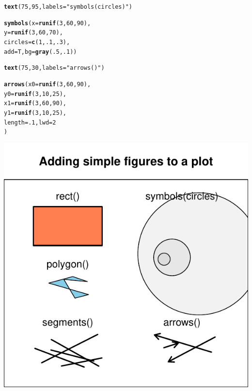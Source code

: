 \documentclass{tufte-book}\usepackage[]{graphicx}\usepackage[]{color}
\makeatletter
\def\maxwidth{ %
  \ifdim\Gin@nat@width>\linewidth
    \linewidth
  \else
    \Gin@nat@width
  \fi
}
\newcommand{\hlnum}[1]{\textcolor[rgb]{0.686,0.059,0.569}{#1}}%
\newcommand{\hlstr}[1]{\textcolor[rgb]{0.192,0.494,0.8}{#1}}%
\newcommand{\hlstd}[1]{\textcolor[rgb]{0.345,0.345,0.345}{#1}}%
\newcommand{\hlkwc}[1]{\textcolor[rgb]{0.333,0.667,0.333}{#1}}%
\newcommand{\hlkwd}[1]{\textcolor[rgb]{0.737,0.353,0.396}{\textbf{#1}}}%
\newenvironment{kframe}{%
 \def\at@end@of@kframe{}%
 \ifinner\ifhmode%
  \def\at@end@of@kframe{\end{minipage}}%
  \begin{minipage}{\columnwidth}%
 \fi\fi%
 \def\FrameCommand##1{\hskip\@totalleftmargin \hskip-\fboxsep
 \colorbox{shadecolor}{##1}\hskip-\fboxsep
     \hskip-\linewidth \hskip-\@totalleftmargin \hskip\columnwidth}%
 \MakeFramed {\advance\hsize-\width
   \@totalleftmargin\z@ \linewidth\hsize
   \@setminipage}}%
 {\par\unskip\endMakeFramed%
 \at@end@of@kframe}
\newenvironment{knitrout}{}{} %
\makeatother
\begin{document}
\begin{marginfigure}
\begin{tiny}
\begin{knitrout}
\begin{kframe}
\begin{alltt}
\hlkwd{text}\hlstd{(}\hlnum{75}\hlstd{,} \hlnum{95}\hlstd{,} \hlkwc{labels} \hlstd{=} \hlstr{"symbols(circles)"}\hlstd{)}

\hlkwd{symbols}\hlstd{(}\hlkwc{x} \hlstd{=} \hlkwd{runif}\hlstd{(}\hlnum{3}\hlstd{,} \hlnum{60}\hlstd{,} \hlnum{90}\hlstd{),}
        \hlkwc{y} \hlstd{=} \hlkwd{runif}\hlstd{(}\hlnum{3}\hlstd{,} \hlnum{60}\hlstd{,} \hlnum{70}\hlstd{),}
        \hlkwc{circles} \hlstd{=} \hlkwd{c}\hlstd{(}\hlnum{1}\hlstd{,} \hlnum{.1}\hlstd{,} \hlnum{.3}\hlstd{),}
        \hlkwc{add} \hlstd{= T,} \hlkwc{bg} \hlstd{=} \hlkwd{gray}\hlstd{(}\hlnum{.5}\hlstd{,} \hlnum{.1}\hlstd{))}

\hlkwd{text}\hlstd{(}\hlnum{75}\hlstd{,} \hlnum{30}\hlstd{,} \hlkwc{labels} \hlstd{=} \hlstr{"arrows()"}\hlstd{)}

\hlkwd{arrows}\hlstd{(}\hlkwc{x0} \hlstd{=} \hlkwd{runif}\hlstd{(}\hlnum{3}\hlstd{,} \hlnum{60}\hlstd{,} \hlnum{90}\hlstd{),}
         \hlkwc{y0} \hlstd{=} \hlkwd{runif}\hlstd{(}\hlnum{3}\hlstd{,} \hlnum{10}\hlstd{,} \hlnum{25}\hlstd{),}
         \hlkwc{x1} \hlstd{=} \hlkwd{runif}\hlstd{(}\hlnum{3}\hlstd{,} \hlnum{60}\hlstd{,} \hlnum{90}\hlstd{),}
         \hlkwc{y1} \hlstd{=} \hlkwd{runif}\hlstd{(}\hlnum{3}\hlstd{,} \hlnum{10}\hlstd{,} \hlnum{25}\hlstd{),}
         \hlkwc{length} \hlstd{=} \hlnum{.1}\hlstd{,} \hlkwc{lwd} \hlstd{=} \hlnum{2}
         \hlstd{)}
\end{alltt}
\end{kframe}
\includegraphics[width=\maxwidth]{figure/unnamed-chunk-222-1} 

\end{knitrout}
\end{tiny}
\end{marginfigure}
\end{document}

